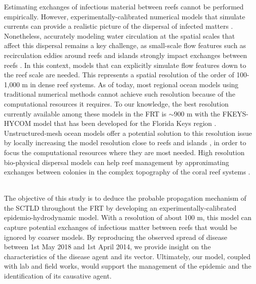\documentclass[utf8]{frontiersSCNS}
\newcommand{\dobby}[1]{\textbf{\color{violet}{#1}}}
\begin{document}
\dobby{Hydrodynamic modeling:} Estimating exchanges of infectious material between reefs cannot be performed empirically. However, experimentally-calibrated numerical models that simulate currents can provide a realistic picture of the dispersal of infected matters \dobby{[Insist more on necessity of using models ?]}. Nonetheless, accurately modeling water circulation at the spatial scales that affect this dispersal remains a key challenge, as small-scale flow features such as recirculation eddies around reefs and islands strongly impact exchanges between reefs \citep{wolanski1994physical, burgess2007influence, figueiredo2013synthesizing}. In this context, models that can explicitly simulate flow features down to the reef scale are needed. This represents a spatial resolution of the order of 100-1,000 m in dense reef systems. As of today, most regional ocean models using traditional numerical methods cannot achieve such resolution because of the computational resources it requires. To our knowledge, the best resolution currently available among these models in the FRT is $\sim900$ m with the FKEYS-HYCOM model that has been developed for the Florida Keys region \citep{kourafalou2012florida, sponaugle2012observed, vaz2016perfect}.
Unstructured-mesh ocean models offer a potential solution to this resolution issue by locally increasing the model resolution close to reefs and islands \citep{lambrechts2008multi, thomas2014numerical, thomas2015connectivity}, in order to focus the computational resources where they are most needed. High resolution bio-physical dispersal models can help reef management by approximating exchanges between colonies in the complex topography of the coral reef systems \citep{frys20}. \\
\dobby{Applications of our methodology (= modeling hydro + deduce other things) e.g connectivity ?}\\
\dobby{Other applications of SIR model with hydro/networks ?}


The objective of this study is to deduce the probable propagation mechanism of the SCTLD throughout the FRT by developing an experimentally-calibrated epidemio-hydrodynamic model. With a resolution of about 100 m, this model can capture potential exchanges of infectious matter between reefs that would be ignored by coarser models. By reproducing the observed spread of disease between 1st May 2018 and 1st April 2014, we provide insight on the characteristics of the disease agent and its vector. Ultimately, our model, coupled with lab and field works, would support the management of the epidemic and the identification of its causative agent.
\end{document}
